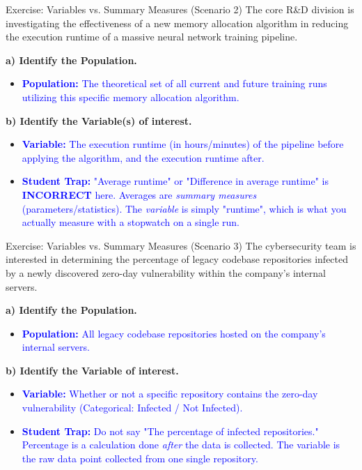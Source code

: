 \documentclass[aspectratio=169]{beamer}
\begin{document}
\begin{frame}{Exercise: Variables vs. Summary Measures (Scenario 2)}
    \small
    The core R\&D division is investigating the effectiveness of a new memory allocation algorithm in reducing the execution runtime of a massive neural network training pipeline. 
    
    \textbf{a) Identify the Population.} \pause
    \begin{itemize}
        \item \textcolor{blue}{\textbf{Population:} The theoretical set of all current and future training runs utilizing this specific memory allocation algorithm.}
    \end{itemize} \pause
    
    \vspace{0.4cm}
    \textbf{b) Identify the Variable(s) of interest.} \pause
    \begin{itemize}
        \item \textcolor{blue}{\textbf{Variable:} The execution runtime (in hours/minutes) of the pipeline before applying the algorithm, and the execution runtime after.}
        \vspace{0.2cm}
        \item \textcolor{blue}{\textbf{Student Trap:} "Average runtime" or "Difference in average runtime" is \textbf{INCORRECT} here. Averages are \emph{summary measures} (parameters/statistics). The \emph{variable} is simply "runtime", which is what you actually measure with a stopwatch on a single run.}
    \end{itemize}
\end{frame}

\begin{frame}{Exercise: Variables vs. Summary Measures (Scenario 3)}
    \small
    The cybersecurity team is interested in determining the percentage of legacy codebase repositories infected by a newly discovered zero-day vulnerability within the company's internal servers.
    
    \textbf{a) Identify the Population.} \pause
    \begin{itemize}
        \item \textcolor{blue}{\textbf{Population:} All legacy codebase repositories hosted on the company's internal servers.}
    \end{itemize} \pause
    
    \vspace{0.4cm}
    \textbf{b) Identify the Variable of interest.} \pause
    \begin{itemize}
        \item \textcolor{blue}{\textbf{Variable:} Whether or not a specific repository contains the zero-day vulnerability (Categorical: Infected / Not Infected).}
        \vspace{0.2cm}
        \item \textcolor{blue}{\textbf{Student Trap:} Do not say "The percentage of infected repositories." Percentage is a calculation done \emph{after} the data is collected. The variable is the raw data point collected from one single repository.}
    \end{itemize}
\end{frame}
\end{document}
